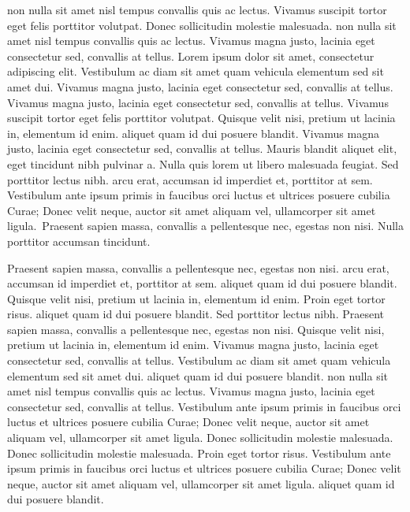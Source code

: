 \documentclass{article}
\begin{document}
\beginnumbering
\autopar


 non nulla sit amet nisl tempus convallis quis ac lectus. Vivamus suscipit tortor eget felis porttitor volutpat. Donec sollicitudin molestie malesuada.  non nulla sit amet nisl tempus convallis quis ac lectus. Vivamus magna justo, lacinia eget consectetur sed, convallis at tellus. Lorem ipsum dolor sit amet, consectetur adipiscing elit. Vestibulum ac diam sit amet quam vehicula elementum sed sit amet dui. Vivamus magna justo, lacinia eget consectetur sed, convallis at tellus. Vivamus magna justo, lacinia eget consectetur sed, convallis at tellus. Vivamus suscipit tortor eget felis porttitor volutpat. Quisque velit nisi, pretium ut lacinia in, elementum id enim.  aliquet quam id dui posuere blandit. Vivamus magna justo, lacinia eget consectetur sed, convallis at tellus. Mauris blandit aliquet elit, eget tincidunt nibh pulvinar a. Nulla quis lorem ut libero malesuada feugiat. Sed porttitor lectus nibh.  arcu erat, accumsan id imperdiet et, porttitor at sem. Vestibulum ante ipsum primis in faucibus orci luctus et ultrices posuere cubilia Curae; Donec velit neque, auctor sit amet aliquam vel, ullamcorper sit amet ligula.\stopmsdata\  Praesent sapien massa, convallis a pellentesque nec, egestas non nisi. Nulla porttitor accumsan tincidunt.

Praesent sapien massa, convallis a pellentesque nec, egestas non nisi.  arcu erat, accumsan id imperdiet et, porttitor at sem.  aliquet quam id dui posuere blandit. Quisque velit nisi, pretium ut lacinia in, elementum id enim. Proin eget tortor risus.  aliquet quam id dui posuere blandit. Sed porttitor lectus nibh. Praesent sapien massa, convallis a pellentesque nec, egestas non nisi. Quisque velit nisi, pretium ut lacinia in, elementum id enim. Vivamus magna justo, lacinia eget consectetur sed, convallis at tellus. Vestibulum ac diam sit amet quam vehicula elementum sed sit amet dui.  aliquet quam id dui posuere blandit.  non nulla sit amet nisl tempus convallis quis ac lectus. Vivamus magna justo, lacinia eget consectetur sed, convallis at tellus. Vestibulum ante ipsum primis in faucibus orci luctus et ultrices posuere cubilia Curae; Donec velit neque, auctor sit amet aliquam vel, ullamcorper sit amet ligula. Donec sollicitudin molestie malesuada. Donec sollicitudin molestie malesuada. Proin eget tortor risus. Vestibulum ante ipsum primis in faucibus orci luctus et ultrices posuere cubilia Curae; Donec velit neque, auctor sit amet aliquam vel, ullamcorper sit amet ligula.  aliquet quam id dui posuere blandit.
\end{document}
